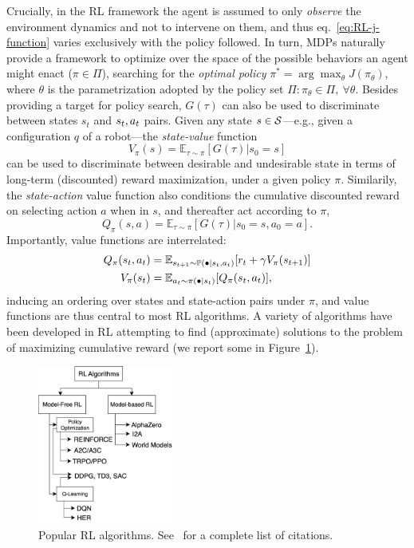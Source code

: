 Crucially, in the RL framework the agent is assumed to only \emph{observe} the environment dynamics and not to intervene on them, and thus eq.~\ref{eq:RL-j-function} varies exclusively with the policy followed.
In turn, MDPs naturally provide a framework to optimize over the space of the possible behaviors an agent might enact (\( \pi \in \Pi \)), searching for the \emph{optimal policy} \( \pi^* = \arg \max_{\theta} J(\pi_\theta) \), where \( \theta \) is the parametrization adopted by the policy set \( \Pi: \pi_\theta \in \Pi, \ \forall \theta \).
Besides providing a target for policy search, \( G(\tau) \) can also be used to discriminate between states \( s_t \) and \(s_t, a_t\) pairs.
Given any state \( s \in \mathcal S \)---e.g., given a configuration \( q \) of a robot---the \emph{state-value} function
\[
    V_\pi(s) = \mathbb E_{\tau \sim \pi} \left[ G(\tau) \big \vert s_0 = s \right]
\]
can be used to discriminate between desirable and undesirable state in terms of long-term (discounted) reward maximization, under a given policy \(\pi\).
Similarily, the \emph{state-action} value function also conditions the cumulative discounted reward on selecting action \( a \) when in \( s \), and thereafter act according to \( \pi \),
\[
    Q_\pi(s,a) = \mathbb E_{\tau \sim \pi} \left[ G (\tau) \big \vert s_0 = s, a_0=a \right].
\]
Importantly, value functions are interrelated:
\begin{align}
Q_\pi(s_t, a_t) &= \mathbb{E}_{\stateplusone \sim \mathbb P(\bullet \vert \state, \action)} \left[ r_t + \gamma V_\pi(\stateplusone) \right] \label{eq:q-as-v} \\
V_\pi(\state) &= \mathbb E_{\action \sim \pi(\bullet \vert \state)} \left[ Q_\pi (\state, \action) \right],
\label{eq:v-as-q}
\end{align}
inducing an ordering over states and state-action pairs under \( \pi \), and value functions are thus central to most RL algorithms.
A variety of algorithms have been developed in RL attempting to find (approximate) solutions to the problem of maximizing cumulative reward (we report some in Figure~\ref{fig:rl-algos-atlas}).

\begin{figure}
    \centering
    \includegraphics[width=0.4\textwidth]{figures/ch3/ch3-rl-algorithms-atlas.pdf}
    \caption{Popular RL algorithms. See~\citet{SpinningUp2018} for a complete list of citations.}
    \label{fig:rl-algos-atlas}
\end{figure}

